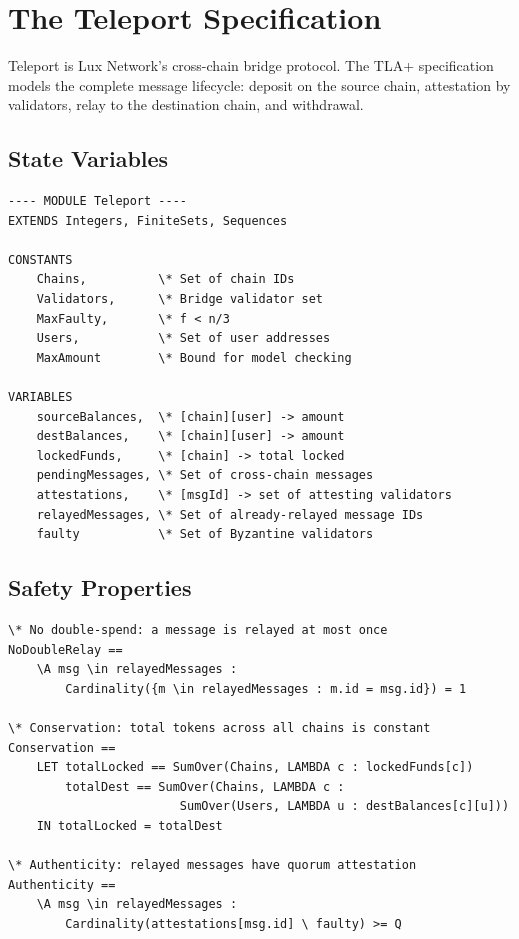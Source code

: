 \section{The Teleport Specification}


Teleport is Lux Network's cross-chain bridge protocol. The TLA+ specification models
the complete message lifecycle: deposit on the source chain, attestation by validators,
relay to the destination chain, and withdrawal.

\subsection{State Variables}

\begin{lstlisting}[language=TLA,caption={Teleport state variables}]
---- MODULE Teleport ----
EXTENDS Integers, FiniteSets, Sequences

CONSTANTS
    Chains,          \* Set of chain IDs
    Validators,      \* Bridge validator set
    MaxFaulty,       \* f < n/3
    Users,           \* Set of user addresses
    MaxAmount        \* Bound for model checking

VARIABLES
    sourceBalances,  \* [chain][user] -> amount
    destBalances,    \* [chain][user] -> amount
    lockedFunds,     \* [chain] -> total locked
    pendingMessages, \* Set of cross-chain messages
    attestations,    \* [msgId] -> set of attesting validators
    relayedMessages, \* Set of already-relayed message IDs
    faulty           \* Set of Byzantine validators
\end{lstlisting}

\subsection{Safety Properties}

\begin{lstlisting}[language=TLA,caption={Teleport safety properties}]
\* No double-spend: a message is relayed at most once
NoDoubleRelay ==
    \A msg \in relayedMessages :
        Cardinality({m \in relayedMessages : m.id = msg.id}) = 1

\* Conservation: total tokens across all chains is constant
Conservation ==
    LET totalLocked == SumOver(Chains, LAMBDA c : lockedFunds[c])
        totalDest == SumOver(Chains, LAMBDA c :
                        SumOver(Users, LAMBDA u : destBalances[c][u]))
    IN totalLocked = totalDest

\* Authenticity: relayed messages have quorum attestation
Authenticity ==
    \A msg \in relayedMessages :
        Cardinality(attestations[msg.id] \ faulty) >= Q
\end{lstlisting}

